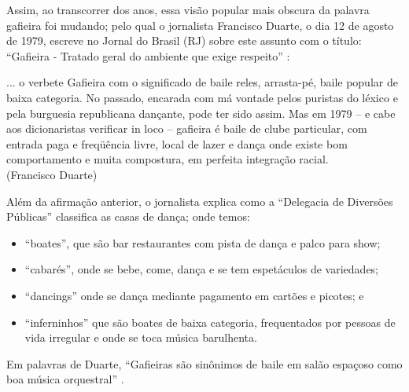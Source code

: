 Assim, ao transcorrer dos anos, essa visão popular mais obscura da palavra gafieira foi mudando;
pelo qual o jornalista Francisco Duarte, o dia 12 de agosto de 1979,
escreve no Jornal do Brasil (RJ) sobre este assunto com o título:
``Gafieira - Tratado geral do ambiente que exige respeito'' \cite[pp. 10]{respeitojournalbrasil1}:
\begin{citando}%
... o verbete Gafieira com o significado de baile reles, arrasta-pé, baile popular de baixa categoria.
No passado, encarada com má vontade pelos puristas do léxico e pela burguesia republicana dançante,
pode ter sido assim. Mas em 1979 -- e cabe aos dicionaristas verificar in loco --
gafieira é baile de clube particular, com entrada paga e freqüência livre, 
local de lazer e dança onde existe bom comportamento e muita compostura,
em perfeita integração racial.\\
(Francisco Duarte)
\end{citando}
Além da afirmação anterior, 
o jornalista explica como a ``Delegacia de Diversões Públicas'' classifica as casas de dança;
onde temos: 
\begin{itemize}
\item ``boates'', que são bar restaurantes com pista de dança e palco para show;
\item ``cabarés'', onde se bebe, come, dança e se tem espetáculos de variedades;
\item ``dancings'' onde se dança mediante pagamento em cartões e picotes; e 
\item ``inferninhos'' que são boates de baixa categoria, 
frequentados por pessoas de vida irregular e onde se toca música barulhenta.
\end{itemize} 
Em palavras de Duarte, ``Gafieiras são sinônimos de baile em salão espaçoso como boa música orquestral'' \cite[pp. 11]{respeitojournalbrasil1}.




